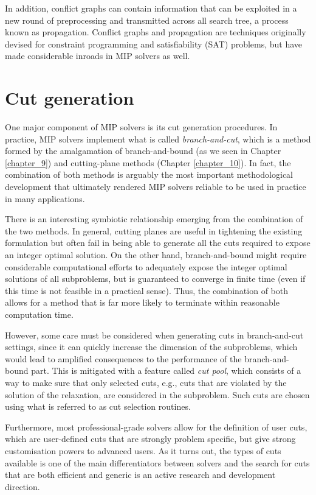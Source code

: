 In addition, conflict graphs can contain information that can be exploited in a new round of preprocessing and transmitted across all search tree, a process known as propagation. Conflict graphs and propagation are techniques originally devised for constraint programming and satisfiability (SAT) problems, but have made considerable inroads in MIP solvers as well.


\section{Cut generation}

One major component of MIP solvers is its cut generation procedures. In practice, MIP solvers implement what is called \emph{branch-and-cut}, which is a method formed by the amalgamation of branch-and-bound (as we seen in Chapter \ref{chapter_9}) and cutting-plane methods (Chapter \ref{chapter_10}). In fact, the combination of both methods is arguably the most important methodological development that ultimately rendered MIP solvers reliable to be used in practice in many applications. 

There is an interesting symbiotic relationship emerging from the combination of the two methods. In general, cutting planes are useful in tightening the existing formulation but often fail in being able to generate all the cuts required to expose an integer optimal solution. On the other hand, branch-and-bound might require considerable computational efforts to adequately expose the integer optimal solutions of all subproblems, but is guaranteed to converge in finite time (even if this time is not feasible in a practical sense). Thus, the combination of both allows for a method that is far more likely to terminate within reasonable computation time.

However, some care must be considered when generating cuts in branch-and-cut settings, since it can quickly increase the dimension of the subproblems, which would lead to amplified consequences to the performance of the branch-and-bound part. This is mitigated with a feature called \emph{cut pool}, which consists of a way to make sure that only selected cuts, e.g., cuts that are violated by the solution of the relaxation, are considered in the subproblem. Such cuts are chosen using what is referred to as cut selection routines.

Furthermore, most professional-grade solvers allow for the definition of user cuts, which are user-defined cuts that are strongly problem specific, but give strong customisation powers to advanced users. As it turns out, the types of cuts available is one of the main differentiators between solvers and the search for cuts that are both efficient and generic is an active research and development direction.

